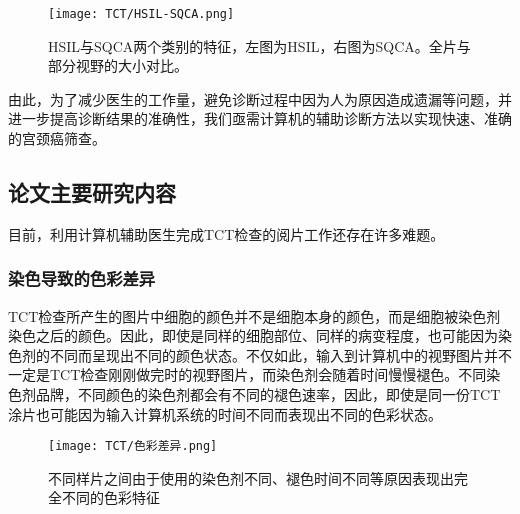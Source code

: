 \begin{enumerate}
          \begin{figure}[h]
              \centering
              \texttt{[image: TCT/HSIL-SQCA.png]}
              \caption{HSIL与SQCA两个类别的特征，左图为HSIL，右图为SQCA。全片与部分视野的大小对比。}
              \label{HSIL-SQCA特征}
          \end{figure}
\end{enumerate}
\par 由此，为了减少医生的工作量，避免诊断过程中因为人为原因造成遗漏等问题，并进一步提高诊断结果的准确性，我们亟需计算机的辅助诊断方法以实现快速、准确的宫颈癌筛查。

\subsection{论文主要研究内容}

\par 目前，利用计算机辅助医生完成TCT检查的阅片工作还存在许多难题。
\subsubsection{染色导致的色彩差异}
\par TCT检查所产生的图片中细胞的颜色并不是细胞本身的颜色，而是细胞被染色剂染色之后的颜色。因此，即使是同样的细胞部位、同样的病变程度，也可能因为染色剂的不同而呈现出不同的颜色状态。不仅如此，输入到计算机中的视野图片并不一定是TCT检查刚刚做完时的视野图片，而染色剂会随着时间慢慢褪色。不同染色剂品牌，不同颜色的染色剂都会有不同的褪色速率，因此，即使是同一份TCT涂片也可能因为输入计算机系统的时间不同而表现出不同的色彩状态。
\begin{figure}[h]
    \centering
    \texttt{[image: TCT/色彩差异.png]}
    \caption{不同样片之间由于使用的染色剂不同、褪色时间不同等原因表现出完全不同的色彩特征}
    \label{论文色彩差异}
\end{figure}
